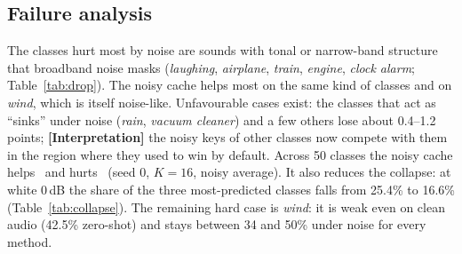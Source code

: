 \begin{table}[H]
\centering\small
\caption{\textbf{[Measured]} adapter cost on top of frozen embeddings (CPU, NumPy/scikit-learn, mean over runs). Tuning includes the full hyper-parameter search on the validation fold.}
\label{tab:res}
\resizebox{0.85\linewidth}{!}{}
\end{table}

\subsection{Failure analysis}

\begin{table}[H]
\centering\small
\begin{minipage}{0.44\linewidth}\centering
\caption{\textbf{[Measured]} classes with the largest zero-shot drop (clean vs.\ average of 12 noisy conditions).}
\label{tab:drop}

\end{minipage}\hfill
\begin{minipage}{0.52\linewidth}\centering
\caption{\textbf{[Measured]} per-class effect of the noisy cache (noisy average, $K{=}16$, seed 0): five largest gains and five largest losses.}
\label{tab:classgain}

\end{minipage}
\end{table}

\begin{table}[H]
\centering\small
\caption{\textbf{[Measured]} prediction collapse at 0\,dB: the three most predicted classes over all 2000 clips (pre-specified grid, $K{=}16$, seed 0).}
\label{tab:collapse}
\resizebox{\linewidth}{!}{}
\end{table}

The classes hurt most by noise are sounds with tonal or narrow-band structure that broadband noise masks (\emph{laughing}, \emph{airplane}, \emph{train}, \emph{engine}, \emph{clock alarm}; Table~\ref{tab:drop}).
The noisy cache helps most on the same kind of classes and on \emph{wind}, which is itself noise-like.
Unfavourable cases exist: the classes that act as ``sinks'' under noise (\emph{rain}, \emph{vacuum cleaner}) and a few others lose about 0.4--1.2 points; \textbf{[Interpretation]} the noisy keys of other classes now compete with them in the region where they used to win by default.
Across 50 classes the noisy cache helps \nClassGain\ and hurts \nClassLoss\ (seed 0, $K{=}16$, noisy average). It also reduces the collapse: at white 0\,dB the share of the three most-predicted classes falls from 25.4\% to 16.6\% (Table~\ref{tab:collapse}).
The remaining hard case is \emph{wind}: it is weak even on clean audio (42.5\% zero-shot) and stays between 34 and 50\% under noise for every method.
